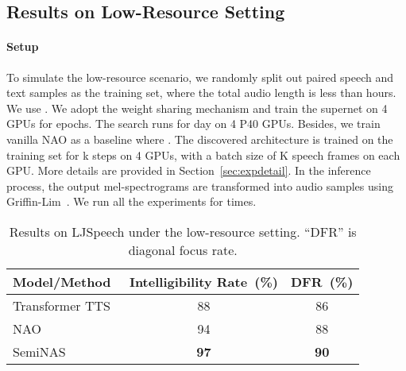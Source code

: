 \documentclass{article}
\begin{document}
\subsection{Results on Low-Resource Setting}
\paragraph{Setup} To simulate the low-resource scenario, we randomly split out  paired speech and text samples as the training set, where the total audio length is less than  hours. We use . We adopt the weight sharing mechanism and train the supernet on 4 GPUs for  epochs. The search runs for  day on 4 P40 GPUs. Besides, we train vanilla NAO as a baseline where . The discovered architecture is trained on the training set for k steps on 4 GPUs, with a batch size of K speech frames on each GPU. More details are provided in Section~\ref{sec:expdetail}. In the inference process, the output mel-spectrograms are transformed into audio samples using Griffin-Lim~\cite{griffin1984signal}. We run all the experiments for  times.
\begin{table}[htbp]
\centering
\small
\begin{tabular}{lcc}
\toprule
Model/Method & Intelligibility Rate~(\%) & DFR~(\%) \\ 
\midrule
Transformer TTS~\cite{transformertts} & 88 & 86 \\
NAO~\cite{nao}             & 94 & 88 \\
SemiNAS         & \textbf{97} & \textbf{90} \\
\bottomrule
\end{tabular}
\caption{Results on LJSpeech under the low-resource setting. ``DFR'' is diagonal focus rate.}
\label{tbl:lowresource}
\end{table}
\end{document}
